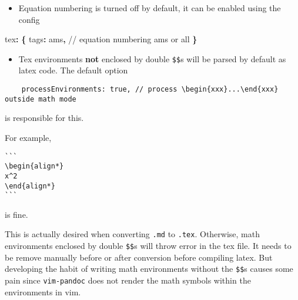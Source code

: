 \documentclass[
]{article}
\newenvironment{Shaded}{}{}
\newcommand{\AttributeTok}[1]{\textcolor[rgb]{0.49,0.56,0.16}{#1}}
\newcommand{\FunctionTok}[1]{\textcolor[rgb]{0.02,0.16,0.49}{#1}}
\newcommand{\KeywordTok}[1]{\textcolor[rgb]{0.00,0.44,0.13}{\textbf{#1}}}
\newcommand{\StringTok}[1]{\textcolor[rgb]{0.25,0.44,0.63}{#1}}
\providecommand{\tightlist}{%
  \setlength{\itemsep}{0pt}\setlength{\parskip}{0pt}}
\begin{document}
\begin{itemize}
\tightlist
\item
  Equation numbering is turned off by default, it can be enabled using
  the config
\end{itemize}

\begin{Shaded}
\begin{Highlighting}[]
\FunctionTok{tex}\KeywordTok{:}\AttributeTok{ }\KeywordTok{\{}
\AttributeTok{    }\FunctionTok{tags}\KeywordTok{:}\AttributeTok{ }\StringTok{\textquotesingle{}ams\textquotesingle{}}\KeywordTok{,}\AttributeTok{              // equation numbering }\StringTok{\textquotesingle{}ams\textquotesingle{}}\AttributeTok{ or }\StringTok{\textquotesingle{}all\textquotesingle{}}
\KeywordTok{\}}
\end{Highlighting}
\end{Shaded}

\begin{itemize}
\tightlist
\item
  Tex environments \textbf{not} enclosed by double \texttt{\$\$}s will
  be parsed by default as latex code. The default option
\end{itemize}

\begin{verbatim}
    processEnvironments: true, // process \begin{xxx}...\end{xxx} outside math mode
\end{verbatim}

is responsible for this.

For example,

\begin{verbatim}
```
\begin{align*}
x^2
\end{align*}
```
\end{verbatim}

is fine.

This is actually desired when converting \texttt{.md} to \texttt{.tex}.
Otherwise, math environments enclosed by double \texttt{\$\$}s will
throw error in the tex file. It needs to be remove manually before or
after conversion before compiling latex. But developing the habit of
writing math environments without the \texttt{\$\$}s causes some pain
since \texttt{vim-pandoc} does not render the math symbols within the
environments in vim.
\end{document}
